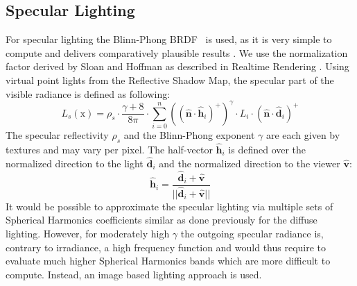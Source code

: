 \documentclass[thesis.tex]{subfiles}
\begin{document}
\subsection{Specular Lighting} \label{sec:impl:specenvmap}
For specular lighting the Blinn-Phong BRDF~\cite{bib:blinnphongbrdf} is used, as it is very simple to compute and delivers comparatively plausible results \cite[p.~251f]{bib:RealtimeRenderingBook}.
We use the normalization factor derived by Sloan and Hoffman as described in Realtime Rendering \cite[p.~257]{bib:RealtimeRenderingBook}. Using virtual point lights from the Reflective Shadow Map, the specular part of the visible radiance is defined as following:
\begin{equation}
L_s (\mathrm{x}) = \rho_s \cdot \frac{\gamma + 8}{8\pi} \cdot \sum\limits_{i=0}^{n} ((\hat{\mathbf{n}} \cdot \hat{\mathbf{h}}_i)^+)^\gamma \cdot L_i \cdot (\hat{\mathbf{n}} \cdot \hat{\mathbf{d}}_i)^+
\end{equation}
The specular reflectivity $\rho_s$ and the Blinn-Phong exponent $\gamma$ are each given by textures and may vary per pixel.
The half-vector $\hat{\mathbf{h}}_i$ is defined over the normalized direction to the light $\hat{\mathbf{d}}_i$ and the normalized direction to the viewer $\hat{\mathbf{v}}$:
\begin{equation}
\hat{\mathbf{h}}_i = \frac{\hat{\mathbf{d}}_i + \hat{\mathbf{v}}}{||\hat{\mathbf{d}}_i + \hat{\mathbf{v}}||}
\end{equation}
It would be possible to approximate the specular lighting via multiple sets of Spherical Harmonics coefficients similar as done previously for the diffuse lighting.
However, for moderately high $\gamma$ the outgoing specular radiance is, contrary to irradiance, a high frequency function and would thus require to evaluate much higher Spherical Harmonics bands which are more difficult to compute. Instead, an image based lighting approach is used.
\end{document}
